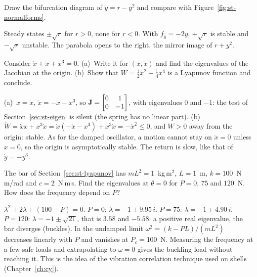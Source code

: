 \label{exo:st-open}
Draw the bifurcation diagram of $\dot y = r - y^2$ and compare with
Figure~\ref{fig:st-normalforms}.
\begin{solution}
Steady states $\pm\sqrt r$ for $r > 0$, none for $r < 0$. With $f_y = -2y$,
$+\sqrt r$ is stable and $-\sqrt r$ unstable. The parabola opens to the right,
the mirror image of $r + y^2$.
\end{solution}

\label{exo:st-lyap}
%
Consider $\ddot x + \dot x + x^3 = 0$. (a)~Write it for $(x,\dot x)$ and find the
eigenvalues of the Jacobian at the origin. (b)~Show that
$W = \tfrac12\dot x^2 + \tfrac14 x^4$ is a Lyapunov function and conclude.
\begin{solution}
(a)~$\dot x = \dot x$, $\ddot x = -\dot x - x^3$, so
$\mathbf{J} = \begin{bmatrix} 0 & 1\\ 0 & -1\end{bmatrix}$, with eigenvalues $0$ and $-1$:
the test of Section~\ref{sec:st-eigen} is silent (the spring has no linear part).
(b)~$\dot W = \dot x\ddot x + x^3\dot x = \dot x(-\dot x - x^3) + x^3\dot x = -\dot x^2 \le 0$,
and $W > 0$ away from the origin: stable. As for the damped oscillator, a motion
cannot stay on $\dot x = 0$ unless $x = 0$, so the origin is asymptotically stable.
The return is slow, like that of $\dot y = -y^3$.
\end{solution}

\label{exo:st-tracedet}
%
The bar of Section~\ref{sec:st-lyapunov} has $mL^2 = 1$~kg\,m$^2$, $L = 1$~m,
$k = 100$~N\,m/rad and $c = 2$~N\,m\,s. Find the eigenvalues at $\theta = 0$ for
$P = 0$, $75$ and $120$~N. How does the frequency depend on $P$?
\begin{solution}
$\lambda^2 + 2\lambda + (100 - P) = 0$. $P = 0$: $\lambda = -1 \pm 9.95\,i$.
$P = 75$: $\lambda = -1 \pm 4.90\,i$. $P = 120$: $\lambda = -1 \pm \sqrt{21}$, that is
$3.58$ and $-5.58$: a positive real eigenvalue, the bar diverges (buckles). In the
undamped limit $\omega^2 = (k - PL)/(mL^2)$ decreases linearly with $P$ and vanishes at
$P_c = 100$~N. Measuring the frequency at a few safe loads and extrapolating to
$\omega = 0$ gives the buckling load without reaching it. This is the idea of the
vibration correlation technique used on shells (Chapter~\ref{ch:cy}).
\end{solution}

